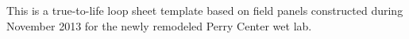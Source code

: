 





This is a true-to-life loop sheet template based on field panels constructed during November 2013 for the newly remodeled Perry Center wet lab.



